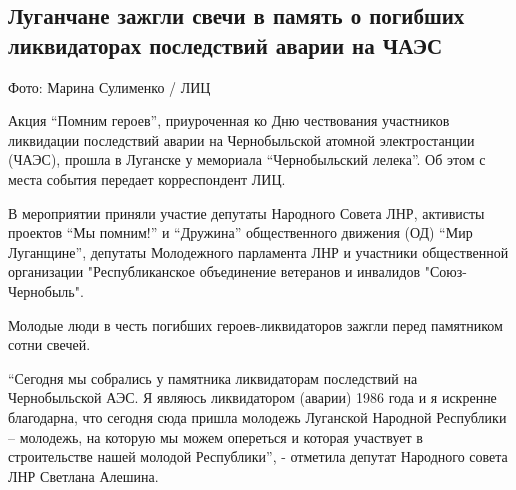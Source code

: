  
 
 
 
 
\subsection{Луганчане зажгли свечи в память о погибших ликвидаторах последствий аварии на ЧАЭС}
\label{sec:14_12_2021.stz.news.lnr.lug_info.2.pamjat_chaes}


Фото: Марина Сулименко / ЛИЦ

Акция \enquote{Помним героев}, приуроченная ко Дню чествования участников ликвидации
последствий аварии на Чернобыльской атомной электростанции (ЧАЭС), прошла в
Луганске у мемориала \enquote{Чернобыльский лелека}. Об этом с места события передает
корреспондент ЛИЦ.


В мероприятии приняли участие депутаты Народного Совета ЛНР, активисты проектов
\enquote{Мы помним!} и \enquote{Дружина} общественного движения (ОД) \enquote{Мир Луганщине}, депутаты
Молодежного парламента ЛНР и участники общественной организации
"Республиканское объединение ветеранов и инвалидов "Союз-Чернобыль".

Молодые люди в честь погибших героев-ликвидаторов зажгли перед памятником сотни
свечей.


\enquote{Сегодня мы собрались у памятника ликвидаторам последствий на Чернобыльской
АЭС. Я являюсь ликвидатором (аварии) 1986 года и я искренне благодарна, что
сегодня сюда пришла молодежь Луганской Народной Республики – молодежь, на
которую мы можем опереться и которая участвует в строительстве нашей молодой
Республики}, - отметила депутат Народного совета ЛНР Светлана Алешина.

